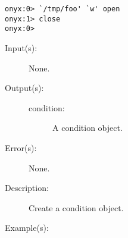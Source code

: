 \begin{description}
\begin{description}
\begin{verbatim}
onyx:0> `/tmp/foo' `w' open
onyx:1> close
onyx:0>
		\end{verbatim}
	\end{description}
\label{systemdict:condition}
\item[{\onyxop{--}{condition}{condition}}: ]
	\begin{description}\item[]
	\item[Input(s): ] None.
	\item[Output(s): ]
		\begin{description}\item[]
		\item[condition: ]
			A condition object.
		\end{description}
	\item[Error(s): ] None.
	\item[Description: ]
		Create a condition object.
	\item[Example(s): ]\begin{verbatim}


\end{verbatim}
\end{description}
\end{description}
